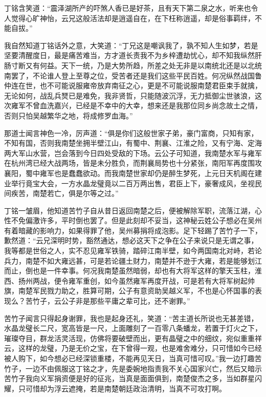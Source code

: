 丁铭含笑道：“震泽湖所产的吓煞人香已是好茶，且有天下第二泉之水，听来也令人觉得心旷神怡，云兄这般活法却是逍遥自在，在下枉称逍遥，却是俗事羁绊，不能自拔。”

我自然知道丁铭话外之意，大笑道：“丁兄这是嘲讽我了，孰不知人生如梦，若是坚要清醒度日，最是痛苦难当，方才道长责我不为乡梓遭劫忧心，却不知我纵然肝肠寸断又有何益。天下一统，乃是大势所趋，所差之处无非是以南统北还是以北统南罢了，不论谁人登上至尊之位，受苦者还是我们这些平民百姓。何况纵然战国鲁仲连在世，也不可能说服雍帝放弃南征之心，更是不可能说服南楚君臣束手就擒，无论如何，战乱兵燹已是难免，我非贤哲，只能随波沉浮，无力抵御尘世骇浪，这次雍军不曾血洗嘉兴，已经是不幸中的大幸，想来还是我那位同乡尚念故土之情，否则只怕吴越繁华之地，将成修罗血海。”

那道士闻言神色一冷，厉声道：“俱是你们这般世家子弟，豪门富商，只知有家，不知有国，否则我南楚坐拥半壁江山，有蜀中、荆襄、江淮之险，又有宁海、定海两大军山水营，岂会落到今日四处受敌的下场。云公子可知道，我南楚水军与雍军在杭州湾已经大战两场，皆是未分胜负，而荆襄局势也十分紧张，南阳军再度围攻襄阳，蜀中雍军也是蠢蠢欲动。而我南楚世家却仍是醉生梦死，上元日天机阁在建业举行竟宝大会，一方水晶龙璧竟以二百万两出售，君臣上下，豪奢成风，坐视民间疾苦，南楚若亡，俱是尔等之过。”

丁铭一皱眉，他知道苦竹子自从昔日返回南楚之后，便被解除军职，流落江湖，心性不免偏激许多，平时倒也罢了。但是此刻却不妥当，这神秘云姓公子想必在吴州有着暗藏的影响力，如果得罪了他，吴州募捐将成泡影。足下轻踢了苦竹子一下，歉然道：“云兄深明时势，豁然通达，想必这天下之争在公子来说只是无谓之事，我等都是世俗之人，实不忍见雍军铁骑，踏碎江南半壁，如今两国南北对峙，若论兵力，南楚不如大雍远甚，可是若论疆土财力，南楚并不逊于大雍，若是能够划江而止，倒也是一件幸事。何况我南楚虽然暗弱，却也有大将军这样的擎天玉柱，淮西、扬州两战，便令雍军重创，如今虽然雍军再度开战，可是若有大将军树起帅旗，南楚军民戮力助之，胜算可期，公子有意资助吴越义军，不也是心怀国事的表现么？苦竹子，云公子非是那些平庸之辈可比，还不谢罪。”

苦竹子闻言只得起身谢罪，我也是起身还礼，笑道：“苦主道长所说也无甚差错，水晶龙璧长二尺，宽高皆是一尺，上面雕刻了一百零八条蟠龙，若置于灯火之下，璀璨夺目，群龙活灵活现，仿佛将要破壁而出，更有晶璧之中的细纹，宛似重重祥云，这样的龙璧，乃是无价之宝，在下曾得一观，也是难舍难分，只可惜如今已经被人购下，如今想必已经深锁重楼，不能再见天日，当真可惜可叹。”我一边打趣苦竹子，一边不由佩服这丁铭之才，先是委婉地指责我不关心国家兴亡，然后又暗示苦竹子我向义军捐资便是好的征兆，当真是面面俱到，南楚俊杰之多，当如群星闪耀，只可惜却为浮云遮掩，若是南楚朝廷政治清明，当真不可攻打啊。

